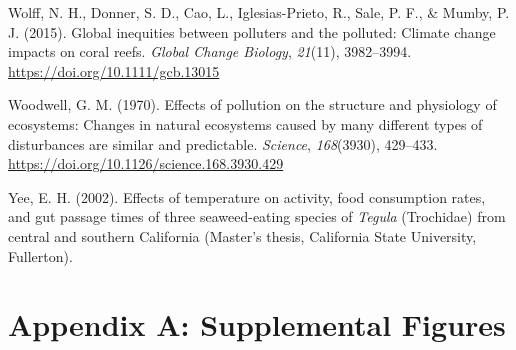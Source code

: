 \documentclass{CSUNthesis}
\begin{document}
Wolff, N. H., Donner, S. D., Cao, L., Iglesias-Prieto, R., Sale, P. F., \& Mumby, P. J. (2015). Global inequities between polluters and the polluted: Climate change impacts on coral reefs. \textit{Global Change Biology}, \textit{21}(11), 3982--3994. \url{https://doi.org/10.1111/gcb.13015}

\vspace{0.1em}

Woodwell, G. M. (1970). Effects of pollution on the structure and physiology of ecosystems: Changes in natural ecosystems caused by many different types of disturbances are similar and predictable. \textit{Science}, \textit{168}(3930), 429--433. \url{https://doi.org/10.1126/science.168.3930.429}

\vspace{0.1em}

Yee, E. H. (2002). Effects of temperature on activity, food consumption rates, and gut passage times of three seaweed-eating species of \textit{Tegula} (Trochidae) from central and southern California (Master's thesis, California State University, Fullerton).

\begingroup
\normalsize

\appendix

\chapter*{Appendix A: Supplemental Figures}\label{appendix-a-supplemental-figures}

\setcounter{figure}{0}
\renewcommand{\thefigure}{A\arabic{figure}}
\end{document}

